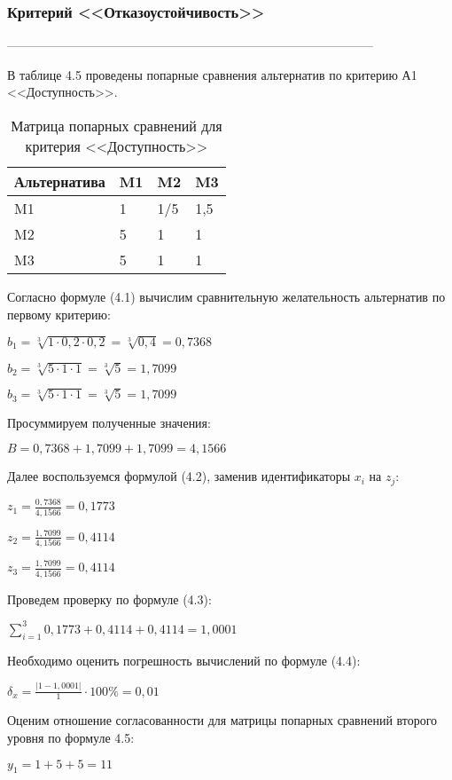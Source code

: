 \subsubsection{Критерий <<Отказоустойчивость>>}

-----------------------------------------------------------------------------------------

В таблице 4.5 проведены попарные сравнения альтернатив по критерию А1 <<Доступность>>.
\begin{table}[H]
  \caption{Матрица попарных сравнений для критерия <<Доступность>>}
  \begin{tabular}{|l|l|l|l|}
  \hline Альтернатива & M1 & M2 & M3 \\
  \hline M1 & 1 & 1/5 & 1,5 \\
  \hline M2 & 5 & 1 & 1 \\
  \hline M3 & 5 & 1 & 1 \\
  \hline
  \end{tabular}
\end{table}

Согласно формуле (4.1) вычислим сравнительную желательность альтернатив по первому критерию:

$b_1 = \sqrt[3]{1 \cdot 0,2 \cdot 0,2} = \sqrt[3]{0,4} = 0,7368$

$b_2 = \sqrt[3]{5 \cdot 1 \cdot 1} = \sqrt[3]{5} = 1,7099$

$b_3 = \sqrt[3]{5 \cdot 1 \cdot 1} = \sqrt[3]{5} = 1,7099$

Просуммируем полученные значения:

$B = 0,7368+ 1,7099 + 1,7099 = 4,1566$

Далее воспользуемся формулой (4.2), заменив идентификаторы $x_i$ на $z_j$:

$z_1 = \frac{0,7368}{4,1566} = 0,1773$

$z_2 = \frac{1,7099}{4,1566} = 0,4114$

$z_3 = \frac{1,7099}{4,1566} = 0,4114$

Проведем проверку по формуле (4.3):

$\sum_{i=1}^{3} 0,1773 + 0,4114 + 0,4114 = 1,0001$

Необходимо оценить погрешность вычислений по формуле (4.4):

$\delta_{x} = \frac{|1 - 1,0001|}{1} \cdot 100\% = 0,01$

Оценим отношение согласованности для матрицы попарных сравнений второго уровня по формуле 4.5:

$y_1 = 1 + 5 + 5 = 11$

